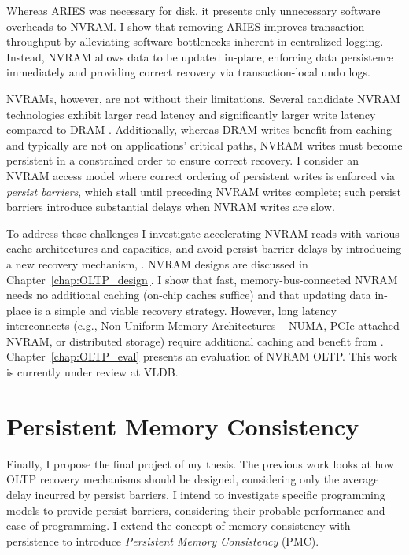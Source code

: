 Whereas ARIES was necessary for disk, it presents only unnecessary software overheads to NVRAM.
I show that removing ARIES improves transaction throughput by alleviating software bottlenecks inherent in centralized logging.
Instead, NVRAM allows data to be updated in-place, enforcing data persistence immediately and providing correct recovery via transaction-local undo logs.

NVRAMs, however, are not without their limitations.
Se\-veral candidate NVRAM technologies exhibit larger read latency and significantly larger write latency compared to DRAM \cite{BurrKurdi08}.
Additionally, whereas DRAM writes benefit from caching and typically are not on applications' critical paths, NVRAM writes must become persistent in a constrained order to ensure correct recovery.
I consider an NVRAM access model where correct ordering of persistent writes is enforced via \emph{persist barriers}, which stall until preceding NVRAM writes complete; such persist barriers introduce substantial delays when NVRAM writes are slow.

To address these challenges I investigate accelerating NVRAM reads with various cache architectures and capacities, and avoid persist barrier delays by introducing a new recovery mechanism, \GroupCommit.
NVRAM designs are discussed in Chapter~\ref{chap:OLTP_design}.
I show that fast, memory-bus-connected NVRAM needs no additional caching (on-chip caches suffice) and that updating data in-place is a simple and viable recovery strategy.
However, long latency interconnects (e.g., Non-Uniform Memory Architectures -- NUMA, PCIe-attached NVRAM, or distributed storage) require additional caching and benefit from \GroupCommit.
Chapter~\ref{chap:OLTP_eval} presents an evaluation of NVRAM OLTP.
This work is currently under review at VLDB.

\section{Persistent Memory Consistency}
\label{sec:Intro:PMC}

Finally, I propose the final project of my thesis.
The previous work looks at how OLTP recovery mechanisms should be designed, considering only the average delay incurred by persist barriers.
I intend to investigate specific programming models to provide persist barriers, considering their probable performance and ease of programming.
I extend the concept of memory consistency with persistence to introduce \emph{Persistent Memory Consistency} (PMC).

